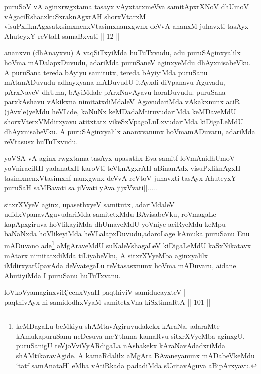 \begin{kandikeshl}
puruSoV vA aginxrwgxtama tasayx vAyxtatxmeVva samitApxrXNoV dhUmoV vAgaciRshacxkuSxraknAgxrAH shorxVtarxM visuPxliknAgxsatxsimxnenxVtasimxnanxgwnx deVvA ananxM juhavxti tasAyx AhuteyxY reVtaH samaBxvati || 12 ||
\end{kandikeshl}

\begin{artha}
ananxvu (dhAnayxvu) A vaqSiTxyiMda huTuTxvudu, adu puruSAginxyalilx
hoVma mADalapxDuvudu, adariMda puruSaneV aginxyeMdu dhAyxnisabeVku. A
puruSana tereda bAyiyu samitutx, tereda bAyiyiMda puruSanu
mAtanADuvudu adhayxyana mADuvudU itAyxdi diVpanavu Aguvadu, pArxNaveV
dhUma, bAyiMdale pArxNavAyavu horaDuvudu. puruSana parxkAshavu
vAkikxna nimitatxdiMdaleV AgavudariMda vAkakxnunx aciR (jAvxle)yeMdu
heVLide, kaNuNx keMDadaMtiruvudariMda keMDaveMdU shorxVterxVMdirxyavu
atitxtatx vikeSxVpagoLuLxvudariMda kiDigaLeMdU dhAyxnisabeVku. A
puruSAginxyalilx ananxvanunx hoVmamADuvaru, adariMda reVtasusx
huTuTxvudu. 
\end{artha}

\begin{kandikeshl}
yoVSA vA aginx rwgxtama tasAyx upasathx Eva samitf loVmAnidhUmoV yoVniraciRH yadanatxH karoVti teV\s knAgxrAH aBinanAdx visuPxliknAgxH tasimxnenxVtasimxnf nanxgwnx deVvA reVtoV juhavxti tasAyx AhuteyxY puruSaH saMBavati sa jiVvati yAva jijxVvati||.....||
\end{kandikeshl}


\begin{artha}
sitxrXVyeV aginx, upasethxyeV samitutx, adariMdaleV
udidxVpanavAguvudariMda samitetxMdu BAvisabeVku, roVmagaLe
kapApxgiruva hoVlikayiMda dhUmaveMdU yoVniye aciRyeMdu keMpu baNaNxda
hoVlikeyiMda heVLalapxDuvudu,\break adaroLage kAmuka puruSanu Enu mADuvano
ade\footnote{keMDagaLu beMkiyu shAMtavAgiruvudakekx kAraNa, adaraMte
  kAmukapuruSanu neDesuva meYthuna kamaRvu sitxrXVyeMba aginxgU,
  puruSanigU teVjoVviVyARdigaLa nAshakekx kAraNavAdadxriMda
  shAMtikaravAgide. A kamaRdalilx aMgAra BAvaneyanunx mADabeVkeMdu
 `tatf samAnataH' eMba vAtiRkada padadiMda sUcitavAguva aBipArxyavu.} aMgAraveMdU suKaleVshagaLeV kiDigaLeMdU kaSxNikatavx
mAtarx nimitatxdiMda tiLiyabeVku, A sitxrXVyeMba aginxyalilx
iMdirxyarUpavAda deVvategaLu reVtasasxnunx hoVma mADuvaru, aidane
AhutiyiMda I puruSanu huTuTxvanu.
\end{artha}

\begin{shl}
loVkoV\s yamaginxviRjecnxVyaH paqthiviV samiducayxteV | \\
paqthivAyx hi samidodhxV\s yaM samitetxVna kiSxtimaRtA \hfill|| 101 || 
\end{shl}

